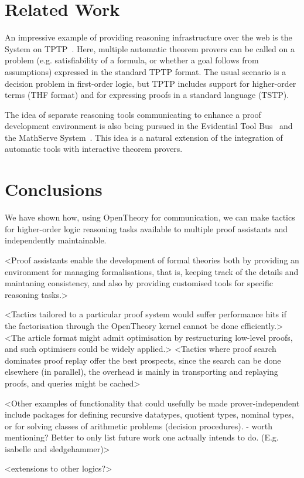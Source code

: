 \documentclass{llncs}
\newcommand{\OpenTheory}{OpenTheory\xspace}
\newcommand{\eg}{e.g.\xspace}
\begin{document}


\section{Related Work}

An impressive example of providing reasoning infrastructure over the web is the System on TPTP~\cite{DBLP:conf/lpar/Sutcliffe10}.
Here, multiple automatic theorem provers can be called on a problem (\eg satisfiability of a formula, or whether a goal follows from assumptions) expressed in the standard TPTP format.
The usual scenario is a decision problem in first-order logic, but TPTP includes support for higher-order terms (THF format) and for expressing proofs in a standard language (TSTP).

The idea of separate reasoning tools communicating to enhance a proof development environment is also being pursued in the Evidential Tool Bus~\cite{DBLP:conf/icfem/Rushby05} and the MathServe System~\cite{DBLP:conf/cade/ZimmerA06}.
This idea is a natural extension of the integration of automatic tools with interactive theorem provers.

\section{Conclusions}

We have shown how, using \OpenTheory for communication, we can make tactics for higher-order logic reasoning tasks available to multiple proof assistants and independently maintainable.

<Proof assistants enable the development of formal theories both by providing an environment for managing formalisations, that is, keeping track of the details and maintaning consistency, and also by providing customised tools for specific reasoning tasks.>

<Tactics tailored to a particular proof system would suffer performance hits if the factorisation through the OpenTheory kernel cannot be done efficiently.>
<The article format might admit optimisation by restructuring low-level proofs, and such optimisers could be widely applied.>
<Tactics where proof search dominates proof replay offer the best prospects, since the search can be done elsewhere (in parallel), the overhead is mainly in transporting and replaying proofs, and queries might be cached>

<Other examples of functionality that could usefully be made prover-independent include packages for defining recursive datatypes, quotient types, nominal types, or for solving classes of arithmetic problems (decision procedures). - worth mentioning? Better to only list future work one actually intends to do. (E.g. isabelle and sledgehammer)>

<extensions to other logics?>



\end{document}
